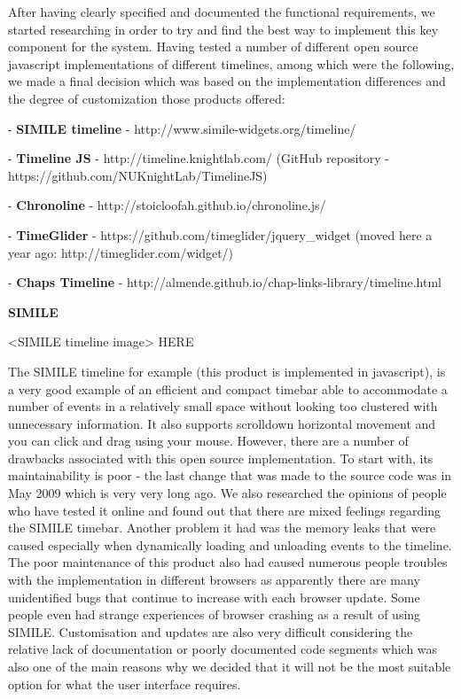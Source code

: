 \documentclass{l3proj}
\begin{document}
After having clearly specified and documented the functional requirements, we started researching in order to try and find the best way to implement this key component for the system. Having tested a number of different open source javascript implementations of different timelines, among which were the following, we made a final decision which was based on the implementation differences and the degree of customization those products offered:


- \textbf{SIMILE timeline} - http://www.simile-widgets.org/timeline/

- \textbf{Timeline JS} - http://timeline.knightlab.com/ (GitHub repository - https://github.com/NUKnightLab/TimelineJS)

- \textbf{Chronoline} - http://stoicloofah.github.io/chronoline.js/

- \textbf{TimeGlider} - https://github.com/timeglider/jquery_widget (moved here a year ago: http://timeglider.com/widget/)

- \textbf{Chaps Timeline} - http://almende.github.io/chap-links-library/timeline.html



\textbf{SIMILE}

<SIMILE timeline image> HERE

The SIMILE timeline for example (this product is implemented in javascript), is a very good example of an efficient and compact timebar able to accommodate a number of events in a relatively small space without looking too clustered with unnecessary information. It also supports scrolldown horizontal movement and  you can click and drag using your mouse. However, there are a number of drawbacks associated with this open source implementation. To start with, its maintainability is poor - the last change that was made to the source code was in May 2009 which is very very long ago. We also researched the opinions of people who have tested it online and found out that there are mixed feelings regarding the SIMILE timebar. Another problem it had was the memory leaks that were caused especially when dynamically loading and unloading events to the timeline. The poor maintenance of this product also had caused numerous people troubles with the implementation in different browsers as apparently there are many unidentified bugs that continue to increase with each browser update. Some people even had strange experiences of browser crashing as a result of using SIMILE. Customisation and updates are also very difficult considering the relative lack of documentation or poorly documented code segments which was also one of the main reasons why we decided that it will not be the most suitable option for what the user interface requires.
\end{document}
